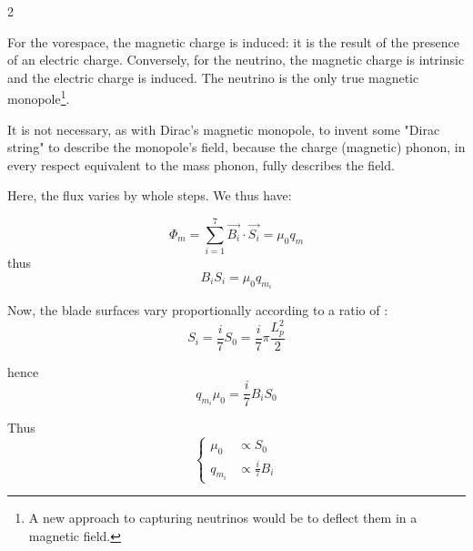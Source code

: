 \begin{multicols}{2}
\begin{center}
	\end{center}
	
	For the vorespace, the magnetic charge is induced: it is the result of the presence of an electric charge. Conversely, for the neutrino, the magnetic charge is intrinsic and the electric charge is induced. The neutrino is the only true magnetic monopole\footnote{A new approach to capturing neutrinos would be to deflect them in a magnetic field.}.
	
	It is not necessary, as with Dirac's magnetic monopole, to invent some "Dirac string" to describe the monopole's field, because the charge (magnetic) phonon, in every respect equivalent to the mass phonon, fully describes the field.
	
	Here, the flux varies by whole steps. We thus have:
	
	\begin{equation*}
		\Phi_m = \sum_{i=1}^{7} \vec{B_i} \cdot \vec{S_i} = \mu_0 q_m
	\end{equation*}
	thus
	\begin{equation*}
		B_i S_i = \mu_0 q_{m_i}
	\end{equation*}
	
	Now, the blade surfaces vary proportionally according to a ratio of :
	\begin{equation*}
		S_i = \frac{i}{7} S_0 = \frac{i}{7} \pi \frac{L_p^2}{2}
	\end{equation*}
	
	hence
	\begin{equation*}
		q_{m_i} \mu_0 = \frac{i}{7} B_i S_0
	\end{equation*}
	
	Thus
	\begin{equation*}
		\left\{
		\begin{split}
			\mu_0  &\propto S_0  \\ 
			q_{m_i}&\propto \frac{i}{7} B_i 
		\end{split}
		\right.
	\end{equation*}
	

\end{multicols}
